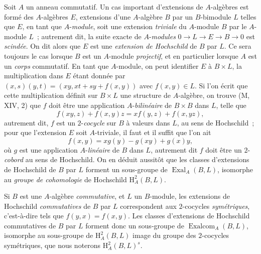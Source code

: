 \begin{env}[18.4.3]
\label{0.18.4.3-fr}
Soit $A$ un anneau commutatif. Un cas important d'extensions de
$A$-algèbres est formé des $A$-algèbres $E$, extensions d'une $A$-algèbre $B$
par un $B$-bimodule $L$ telles que $E$, en tant que $A$-\emph{module}, soit une
extension \emph{triviale} du $A$-module $B$ par le $A$-module $L$~; autrement
dit, la suite exacte de $A$-\emph{modules}
$0\to L\to E\to B\to0$ est \emph{scindée}. On dit alors que $E$ est une
\emph{extension de Hochschild} de $B$ par $L$. Ce sera toujours le cas lorsque
$B$ est un $A$-module \emph{projectif}, et en particulier lorsque $A$ est un
\emph{corps} commutatif. En tant que $A$-module, on peut identifier $E$ à
$B\times L$, la multiplication dans $E$ étant donnée par
$(x,s)(y,t)=(xy,xt+sy+f(x,y))$ avec $f(x,y)\in L$. Si l'on écrit que cette
multiplication définit sur $B\times L$ une structure de $A$-algèbre, on trouve
(M, XIV, 2) que $f$ doit être une application $A$-\emph{bilinéaire} de
$B\times B$ dans $L$, telle que
\begin{equation}
\label{0.18.4.3.1-fr}
\tag{18.4.3.1}
  f(xy,z)+f(x,y)z=xf(y,z)+f(x,yz),
\end{equation}
autrement dit, $f$ est un $2$-\emph{cocycle} sur $B$ à valeurs dans $L$, au
sens de Hochschild~; pour que l'extension $E$ soit $A$-triviale, il faut et il
suffit que l'on ait
\begin{equation}
\label{0.18.4.3.2-fr}
\tag{18.4.3.2}
  f(x,y)=xg(y)-g(xy)+g(x)y,
\end{equation}
où $g$ est une application $A$-\emph{linéaire} de $B$ dans $L$, autrement dit
$f$ doit être un $2$-\emph{cobord} au sens de Hochschild. On en déduit aussitôt
que les classes d'extensions de Hochschild de $B$ par $L$ forment un
sous-groupe de $\operatorname{Exal}_A(B,L)$, isomorphe au \emph{groupe de
cohomologie} de Hochschild $\mathrm H_A^2(B,L)$.

Si $B$ est une $A$-algèbre \emph{commutative}, et $L$ un $B$-module, les
extensions de Hochschild \emph{commutatives} de $B$ par $L$ correspondent aux
$2$-cocycles \emph{symétriques}, c'est-à-dire tels que $f(y,x)=f(x,y)$. Les
classes d'extensions de Hochschild commutatives de $B$ par $L$ forment donc un
sous-groupe de $\operatorname{Exalcom}_A(B,L)$, isomorphe au sous-groupe de
$\mathrm H_A^2(B,L)$ image du groupe des $2$-cocycles symétriques, que nous
noterons $\mathrm H_A^2(B,L)^s$.
\end{env}

